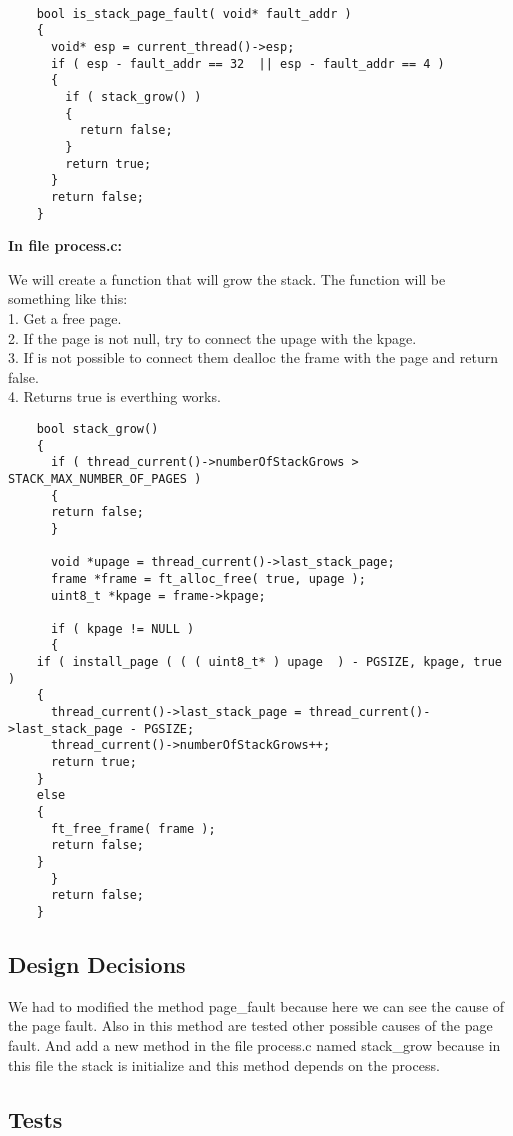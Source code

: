 \begin{lstlisting}

	bool is_stack_page_fault( void* fault_addr )
	{
	  void* esp = current_thread()->esp;
	  if ( esp - fault_addr == 32  || esp - fault_addr == 4 )
	  {
	    if ( stack_grow() )
	    {
	      return false;
	    }
	    return true;
	  }
	  return false;
	}

\end{lstlisting}


\textbf{In file process.c: }

We will create a function that will grow the stack. The function will be something like this:
      \\1. Get a free page. 
      \\2. If the page is not null, try to connect the  upage with the kpage.
      \\3. If is not possible to connect them dealloc the frame with the page and return false.
      \\4. Returns true is everthing works.

\begin{lstlisting}
    bool stack_grow()
    {
      if ( thread_current()->numberOfStackGrows > STACK_MAX_NUMBER_OF_PAGES )
      {
	  return false;
      }

      void *upage = thread_current()->last_stack_page;
      frame *frame = ft_alloc_free( true, upage );
      uint8_t *kpage = frame->kpage;
 
      if ( kpage != NULL )
      {
	if ( install_page ( ( ( uint8_t* ) upage  ) - PGSIZE, kpage, true )
	{
	  thread_current()->last_stack_page = thread_current()->last_stack_page - PGSIZE;
	  thread_current()->numberOfStackGrows++;
	  return true;
	}
	else
	{
	  ft_free_frame( frame );
	  return false;
	}
      }
      return false;
    }

\end{lstlisting}


\subsection{Design Decisions}

We had to modified the method page\_fault because here we can see the cause of the page fault. Also in this method are tested other possible causes of the page fault. And add a new method in the file process.c named stack\_grow because in this file the stack is initialize and this method depends on the process.


\subsection{Tests}

